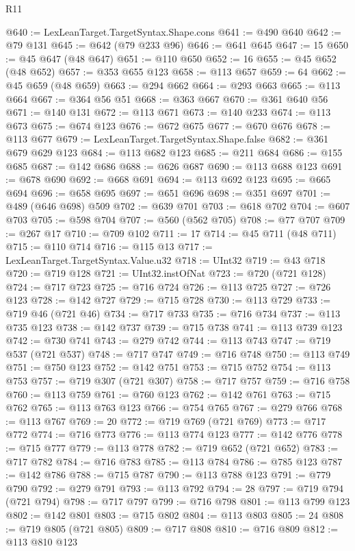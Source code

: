\begin{lexlean}{R11}
\begin{coremodule}
{{{{{{{{{{{{{{{{{{{{{{{{{{{{{{{{{{{{{{{{{{{{{{{{{{{{{{{{{{{{{{{{{{{{{{{{{{{{{{{{{{{{{{{{{{{{{{{{{{{{{{{{{{@640 := LexLeanTarget.TargetSyntax.Shape.cons
@641 := @490 @640
@642 := @79 @131
@645 := @642 (@79 @233 @96)
@646 := @641 @645
@647 := 15
@650 := @45 @647 (@48 @647)
@651 := @110 @650
@652 := 16
@655 := @45 @652 (@48 @652)
@657 := @353 @655 @123
@658 := @113 @657
@659 := 64
@662 := @45 @659 (@48 @659)
@663 := @294 @662
@664 := @293 @663
@665 := @113 @664
@667 := @364 @56 @51
@668 := @363 @667
@670 := @361 @640 @56
@671 := @140 @131
@672 := @113 @671
@673 := @140 @233
@674 := @113 @673
@675 := @674 @123
@676 := @672 @675
@677 := @670 @676
@678 := @113 @677
@679 := LexLeanTarget.TargetSyntax.Shape.false
@682 := @361 @679 @629 @123
@684 := @113 @682 @123
@685 := @211 @684
@686 := @155 @685
@687 := @142 @686
@688 := @626 @687
@690 := @113 @688 @123
@691 := @678 @690
@692 := @668 @691
@694 := @113 @692 @123
@695 := @665 @694
@696 := @658 @695
@697 := @651 @696
@698 := @351 @697
@701 := @489 (@646 @698) @509
@702 := @639 @701
@703 := @618 @702
@704 := @607 @703
@705 := @598 @704
@707 := @560 (@562 @705)
@708 := @77 @707
@709 := @267 @17
@710 := @709 @102
@711 := 17
@714 := @45 @711 (@48 @711)
@715 := @110 @714
@716 := @115 @13
@717 := LexLeanTarget.TargetSyntax.Value.u32
@718 := UInt32
@719 := @43 @718
@720 := @719 @128
@721 := UInt32.instOfNat
@723 := @720 (@721 @128)
@724 := @717 @723
@725 := @716 @724
@726 := @113 @725
@727 := @726 @123
@728 := @142 @727
@729 := @715 @728
@730 := @113 @729
@733 := @719 @46 (@721 @46)
@734 := @717 @733
@735 := @716 @734
@737 := @113 @735 @123
@738 := @142 @737
@739 := @715 @738
@741 := @113 @739 @123
@742 := @730 @741
@743 := @279 @742
@744 := @113 @743
@747 := @719 @537 (@721 @537)
@748 := @717 @747
@749 := @716 @748
@750 := @113 @749
@751 := @750 @123
@752 := @142 @751
@753 := @715 @752
@754 := @113 @753
@757 := @719 @307 (@721 @307)
@758 := @717 @757
@759 := @716 @758
@760 := @113 @759
@761 := @760 @123
@762 := @142 @761
@763 := @715 @762
@765 := @113 @763 @123
@766 := @754 @765
@767 := @279 @766
@768 := @113 @767
@769 := 20
@772 := @719 @769 (@721 @769)
@773 := @717 @772
@774 := @716 @773
@776 := @113 @774 @123
@777 := @142 @776
@778 := @715 @777
@779 := @113 @778
@782 := @719 @652 (@721 @652)
@783 := @717 @782
@784 := @716 @783
@785 := @113 @784
@786 := @785 @123
@787 := @142 @786
@788 := @715 @787
@790 := @113 @788 @123
@791 := @779 @790
@792 := @279 @791
@793 := @113 @792
@794 := 28
@797 := @719 @794 (@721 @794)
@798 := @717 @797
@799 := @716 @798
@801 := @113 @799 @123
@802 := @142 @801
@803 := @715 @802
@804 := @113 @803
@805 := 24
@808 := @719 @805 (@721 @805)
@809 := @717 @808
@810 := @716 @809
@812 := @113 @810 @123
}}}}}}}}}}}}}}}}}}}}}}}}}}}}}}}}}}}}}}}}}}}}}}}}}}}}}}}}}}}}}}}}}}}}}}}}}}}}}}}}}}}}}}}}}}}}}}}}}}}}}}}}}}
\end{coremodule}
\end{lexlean}
